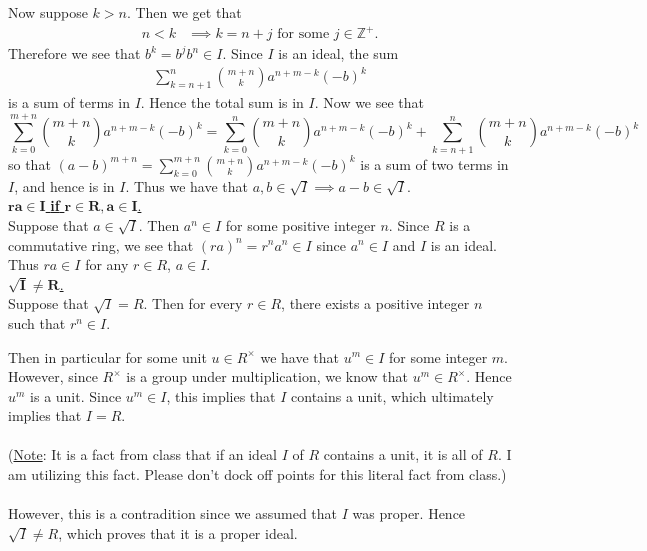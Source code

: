 \begin{prf}
\begin{enumerate}
            Now suppose $k > n$. Then we get that 
            \begin{align*}
                n < k &\implies k =  n + j \text{ for some } j \in \mathbb{Z}^{+}.
            \end{align*}
            Therefore we see that $b^{k} = b^{j}b^{n} \in I$. Since $I$ is an
            ideal, the sum
            \begin{align*}
                \sum_{k = n+1}^{n}\binom{m+n}{k}a^{n + m - k}(-b)^{k}  
            \end{align*}
            is a sum of terms in $I$. Hence the total sum is in $I$. Now we
            see that 
            \[
                \sum_{k = 0}^{m + n}\binom{m+n}{k}a^{n + m - k}(-b)^{k}
                =
                \sum_{k = 0}^{n}\binom{m+n}{k}a^{n + m - k}(-b)^{k}  
                + 
                \sum_{k = n+1}^{n}\binom{m+n}{k}a^{n + m - k}(-b)^{k}
            \]
            so that $\displaystyle (a - b)^{m+n} = \sum_{k = 0}^{m + n}\binom{m+n}{k}a^{n +
            m - k}(-b)^{k}$ is a sum of two terms in $I$, and hence is in $I$.
            Thus we have that $a, b \in \sqrt{I} \implies a - b \in \sqrt{I}$.
            \\[1.2ex]
            \noindent\underline{$\bm{ra \in I}$ \textbf{if} $\bm{r \in R, a
            \in I}$.}\\[1.2ex]
            Suppose that $a \in \sqrt{I}$. Then $a^n \in I$ for some positive integer
            $n$. Since $R$ is a commutative ring, we see that $(ra)^n = r^na^n
            \in I$ since $a^n \in I$ and $I$ is an ideal. Thus $ra \in I$ for
            any $r \in R$, $a \in I$. 
            \\[1.2ex]
            \noindent\underline{$\bm{\sqrt{I} \ne R}$.}\\[1.2ex]
            Suppose that $\sqrt{I} = R$. Then for every $r \in R$, there
            exists a positive integer $n$ such that $r^n  \in I$. 
    
            Then in particular for some unit $u \in R^{\times}$ we have that $u^m
            \in I$ for some integer $m$. However, since $R^\times$ is a
            group under multiplication, we know that $u^m \in R^{\times}$.
            Hence $u^m$ is a unit. Since $u^m \in I$, this implies that
            $I$ contains a unit, which ultimately implies that $I = R$. 
            \\
            \\
            (\underline{Note}: It is a fact from class that if an ideal
            $I$ of $R$ contains a unit, it is all of $R$. I am utilizing
            this fact. Please don't dock off points for this literal fact
            from class.)
            \\
            \\
            However, this is a contradition since we assumed that $I$ was
            proper. Hence $\sqrt{I} \ne R$, which proves that it is a
            proper ideal.
    

\end{enumerate}
\end{prf}
